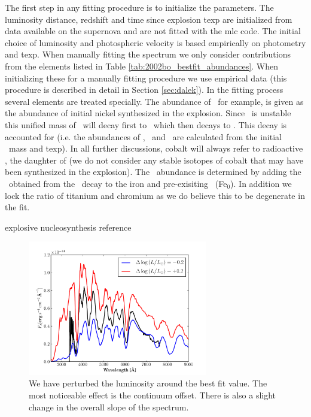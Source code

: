 The first step in any fitting procedure is to initialize the parameters. The luminosity distance, redshift and time since explosion \gls{texp} are initialized from data available on the supernova and are not fitted with the \gls{mlc} code. The initial choice of luminosity and photospheric velocity is based empirically on photometry and \gls{texp}. When manually fitting the spectrum we only consider contributions from the elements listed in Table \ref{tab:2002bo_bestfit_abundances}. When initializing these for a manually fitting procedure we use empirical data (this procedure is described in detail in Section \ref{sec:dalek}). In the fitting process several elements are treated specially. The abundance of \Ni\, for example, is given as the abundance of initial nickel synthesized in the explosion. Since \Ni\ is unstable this unified mass of \Ni\ will decay first to \Co\ which then decays to \Fe. This decay is accounted for (i.e. the abundances of \Ni, \Co\ and \Fe\ are calculated from the initial \Ni\ mass and \gls{texp}). In all further discussions, cobalt will always refer to radioactive \Co, the daughter of \Ni (we do not consider any stable isotopes of cobalt that may have been synthesized in the explosion). The \Fe\ abundance is determined by adding the \Fe\ obtained from the \Ni\ decay to the iron and pre-exisiting \Fe\ (Fe$_0$). In addition we lock the ratio of titanium and chromium as we do believe this to be degenerate in the fit. 

explosive nucleosynthesis reference \citep[e.g.][]{1999ApJS..125..439I}

\begin{figure}[htbp] %
   \centering
   \includegraphics[width=0.7\textwidth]{chapter_dalek/plots/bf2002bo-10_lum.pdf} 
   \caption{We have perturbed the luminosity around the best fit value. The most noticeable effect is the continuum offset. There is also a slight change in the overall slope of the spectrum.} 
   \label{fig:sn2002bo_lum_offset}
\end{figure}

